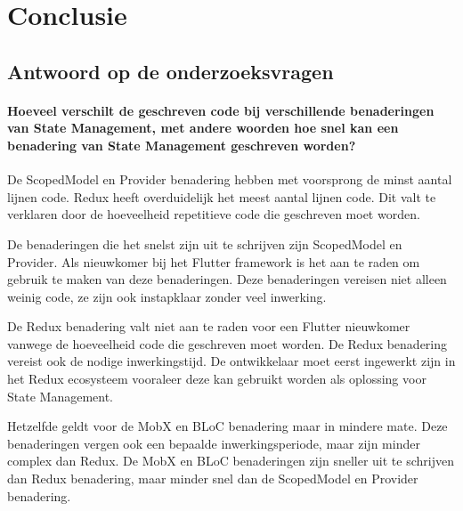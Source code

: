 
\chapter{Conclusie}
\label{ch:conclusie}


\section{Antwoord op de onderzoeksvragen}
\subsubsection{Hoeveel verschilt de geschreven code bij verschillende benaderingen van State Management, met andere woorden hoe snel kan een benadering van State Management geschreven worden?}
De ScopedModel en Provider benadering hebben met voorsprong de minst aantal lijnen code. Redux heeft overduidelijk het meest aantal lijnen code. Dit valt te verklaren door de hoeveelheid repetitieve code die geschreven moet worden. 

De benaderingen die het snelst zijn uit te schrijven zijn ScopedModel en Provider. Als nieuwkomer bij het Flutter framework is het aan te raden om gebruik te maken van deze benaderingen. Deze benaderingen vereisen niet alleen weinig code, ze zijn ook instapklaar zonder veel inwerking.  

De Redux benadering valt niet aan te raden voor een Flutter nieuwkomer vanwege de hoeveelheid code die geschreven moet worden. De Redux benadering vereist ook de nodige inwerkingstijd. De ontwikkelaar moet eerst ingewerkt zijn in het Redux ecosysteem vooraleer deze kan gebruikt worden als oplossing voor State Management. 

Hetzelfde geldt voor de MobX en BLoC benadering maar in mindere mate. Deze benaderingen vergen ook een bepaalde inwerkingsperiode, maar zijn minder complex dan Redux. De MobX en BLoC benaderingen zijn sneller uit te schrijven dan Redux benadering, maar minder snel dan de ScopedModel en Provider benadering.

